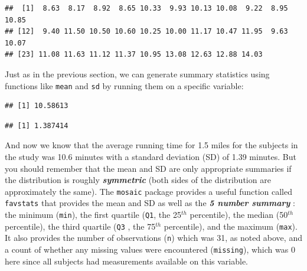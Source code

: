 \documentclass[]{article}
\newenvironment{Shaded}{\begin{snugshade}}{\end{snugshade}}
\newcommand{\KeywordTok}[1]{\textcolor[rgb]{0.13,0.29,0.53}{\textbf{{#1}}}}
\newcommand{\NormalTok}[1]{{#1}}
\begin{document}
\begin{verbatim}
##  [1]  8.63  8.17  8.92  8.65 10.33  9.93 10.13 10.08  9.22  8.95 10.85
## [12]  9.40 11.50 10.50 10.60 10.25 10.00 11.17 10.47 11.95  9.63 10.07
## [23] 11.08 11.63 11.12 11.37 10.95 13.08 12.63 12.88 14.03
\end{verbatim}

Just as in the previous section, we can generate summary statistics
using functions like \texttt{mean} and \texttt{sd} by running them on a
specific variable:

\begin{Shaded}
\end{Shaded}

\begin{verbatim}
## [1] 10.58613
\end{verbatim}

\begin{Shaded}
\end{Shaded}

\begin{verbatim}
## [1] 1.387414
\end{verbatim}

And now we know that the average running time for 1.5 miles for the
subjects in the study was 10.6 minutes with a standard deviation (SD) of
1.39 minutes. But you should remember that the mean and SD are only
appropriate summaries if the distribution is roughly
\textbf{\emph{symmetric}} (both sides of the distribution are
approximately the same). The \texttt{mosaic} package provides a useful
function called \texttt{favstats} that provides the mean and SD as well
as the \textbf{\emph{5 number summary}} : the minimum (\texttt{min}),
the first quartile (\texttt{Q1}, the 25\(^{th}\) percentile), the median
(50\(^{th}\) percentile), the third quartile (\texttt{Q3} , the
75\(^{th}\) percentile), and the maximum (\texttt{max}). It also
provides the number of observations (\texttt{n}) which was 31, as noted
above, and a count of whether any missing values were encountered
(\texttt{missing}), which was 0 here since all subjects had measurements
available on this variable.

\begin{Shaded}
\end{Shaded}
\end{document}
